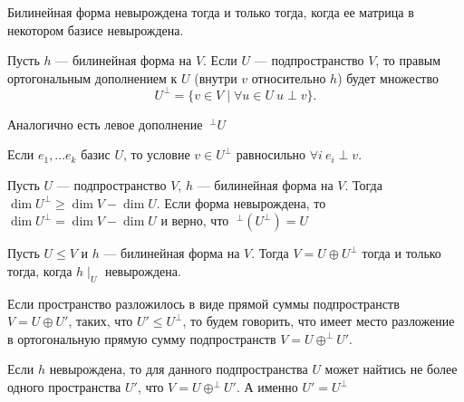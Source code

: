 \begin{st}
    Билинейная форма невырождена тогда и только тогда, когда ее матрица в некотором базисе невырождена.
\end{st}
\begin{defn}
    Пусть $ h$ --- билинейная форма на $ V$. Если  $ U$ --- подпространство  $ V$, то  {\sf правым ортогональным дополнением к $ U$} (внутри $ v$ относительно  $ h$) будет множество
    \[
    U^{\perp} = \{v \in V \mid \forall u \in U ~ u \perp v\}
    .\] 
    \begin{note}
        Аналогично есть левое дополнение $ \:^{\perp}U$
    \end{note}
    \begin{note}
        Если $ e_1, \ldots e_k$ базис $ U$, то условие  $ v \in U^{\perp}$ равносильно $ \forall i ~e_i \perp v$.
    \end{note}
\end{defn}

\begin{st}
    Пусть $ U$ --- подпространство  $ V$,  $ h $ --- билинейная форма на $ V$. Тогда  $ \dim U ^{\perp} \ge \dim V - \dim U$. Если форма невырождена, то 
    $ \dim U^{\perp} = \dim V - \dim U$ и верно, что $ \;^{\perp} \left( U^{\perp} \right) = U$
\end{st}
\begin{st}
    Пусть $ U \le V$ и $ h$ --- билинейная форма на  $ V$. Тогда  $ V = U \oplus U ^{\perp}$ тогда и только тогда, когда $ h \mid_U$ невырождена.
\end{st}
\begin{defn}
    Если пространство разложилось в виде прямой суммы подпространств $ V = U \oplus U'$, таких, что  $ U' \le U^{\perp}$, то будем говорить, что имеет место {\sf разложение в ортогональную прямую сумму} подпространств $ V = U \oplus^{\perp} U'$. 
    \begin{note}
        Если $ h$ невырождена, то для данного подпространства  $ U$ может найтись не более одного пространства  $ U'$, что  $ V = U \oplus^{\perp} U'$.  А именно $ U' = U^{\perp} $
    \end{note}
\end{defn}

